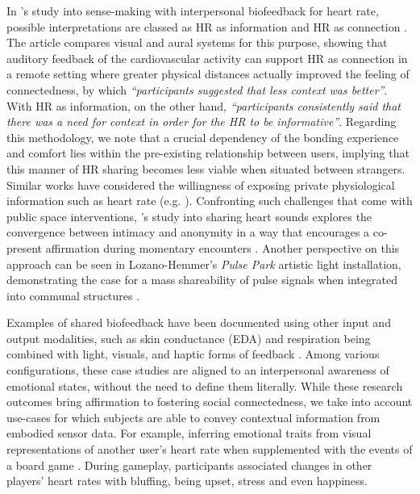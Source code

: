 In \citeauthor{slovak_understanding_2012}'s study into sense-making with interpersonal biofeedback for heart rate, possible interpretations are classed as HR as information and HR as connection \cite{slovak_understanding_2012}. The article compares visual and aural systems for this purpose, showing that auditory feedback of the cardiovascular activity can support HR as connection in a remote setting where greater physical distances actually improved the feeling of connectedness, by which \textit{``participants suggested that less context was better''}. With HR as information, on the other hand, \textit{``participants consistently said that there was a need for context in order for the HR to be informative''}. Regarding this methodology, we note that a crucial dependency of the bonding experience and comfort lies within the pre-existing relationship between users, implying that this manner of HR sharing becomes less viable when situated between strangers. Similar works have considered the willingness of exposing private physiological information such as heart rate (e.g. \cite{walmink_displaying_2013}). Confronting such challenges that come with public space interventions, \citeauthor{howell_life-affirming_2019}'s study into sharing heart sounds explores the convergence between intimacy and anonymity in a way that encourages a co-present affirmation during momentary encounters \cite{howell_life-affirming_2019}. Another perspective on this approach can be seen in Lozano-Hemmer’s \textit{Pulse Park} artistic light installation, demonstrating the case for a mass shareability of pulse signals when integrated into communal structures \cite{lozano-hemmer_2007}.

Examples of shared biofeedback have been documented using other input and output modalities, such as skin conductance (EDA) and respiration being combined with light, visuals, and haptic forms of feedback \cite{frey_breeze_2018,howell_biosignals_2016,ashford_eeg_2019}. Among various configurations, these case studies are aligned to an interpersonal awareness of emotional states, without the need to define them literally. While these research outcomes bring affirmation to fostering social connectedness, we take into account use-cases for which subjects are able to convey contextual information from embodied sensor data. For example, inferring emotional traits from visual representations of another user's heart rate when supplemented with the events of a board game \cite{frey_remote_2016}. During gameplay, participants associated changes in other players' heart rates with bluffing, being upset, stress and even happiness.

